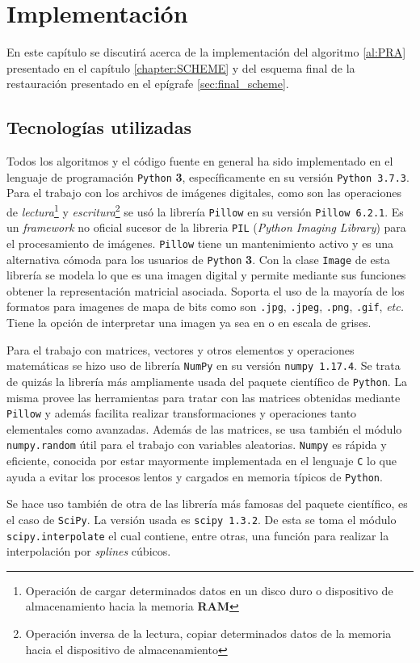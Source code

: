 \chapter{Implementaci\'on}\label{chapter:CODE}

En este capítulo se discutirá acerca de la implementación del algoritmo \ref{al:PRA} presentado en el capítulo \ref{chapter:SCHEME} y del esquema final de la restauraci\'on presentado en el epígrafe \ref{sec:final_scheme}.

\section{Tecnolog\'ias utilizadas}
Todos los algoritmos y el c\'odigo fuente en general ha sido implementado en el lenguaje de programaci\'on \texttt{Python} \textbf{3}, específicamente en su versi\'on \texttt{Python 3.7.3}. Para el trabajo con los archivos de im\'agenes digitales, como son las operaciones de \textit{lectura}\footnote{Operaci\'on de cargar determinados datos en un disco duro o dispositivo de almacenamiento hacia la memoria \textbf{RAM}} y \textit{escritura}\footnote{Operaci\'on inversa de la lectura, copiar determinados datos de la memoria hacia el dispositivo de almacenamiento} se us\'o la librer\'ia \texttt{Pillow} en su versi\'on \texttt{Pillow 6.2.1}. Es un \textit{framework} no oficial sucesor de la libreria \texttt{PIL} (\textit{Python Imaging Library}) para el procesamiento de im\'agenes. \texttt{Pillow} tiene un mantenimiento activo y es una alternativa c\'omoda para los usuarios de \texttt{Python} \textbf{3}. Con la clase \texttt{Image} de esta librer\'ia se modela lo que es una imagen digital y permite mediante sus funciones obtener la representaci\'on matricial asociada. Soporta el uso de la mayor\'ia de los formatos para imagenes de mapa de bits como son \texttt{.jpg}, \texttt{.jpeg}, \texttt{.png}, \texttt{.gif}, \textit{etc.} Tiene la opción de interpretar una imagen ya sea en \RGB o en escala de grises.

Para el trabajo con matrices, vectores y otros elementos y operaciones matem\'aticas se hizo uso de librer\'ia \texttt{NumPy} en su versi\'on \texttt{numpy 1.17.4}. Se trata de quizás la librer\'ia m\'as ampliamente usada del paquete científico de \texttt{Python}. La misma provee las herramientas para tratar con las matrices obtenidas mediante \texttt{Pillow} y adem\'as facilita realizar transformaciones y operaciones tanto elementales como avanzadas. Adem\'as de las matrices, se usa tambi\'en el m\'odulo \texttt{numpy.random} \'util para el trabajo con variables aleatorias. \texttt{Numpy} es r\'apida y eficiente, conocida por estar mayormente implementada en el lenguaje \texttt{C} lo que ayuda a evitar los procesos lentos y cargados en memoria t\'ipicos de \texttt{Python}.

Se hace uso tambi\'en de otra de las librer\'ia m\'as famosas del paquete científico, es el caso de \texttt{SciPy}. La versión usada es \texttt{scipy 1.3.2}. De esta se toma el m\'odulo \texttt{scipy.interpolate} el cual contiene, entre otras, una funci\'on para realizar la interpolaci\'on por \textit{splines} c\'ubicos.